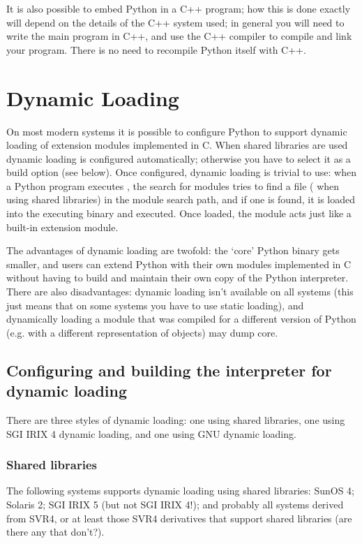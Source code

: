 It is also possible to embed Python in a C++ program; how this is done
exactly will depend on the details of the C++ system used; in general
you will need to write the main program in C++, and use the C++
compiler to compile and link your program.  There is no need to
recompile Python itself with C++.


\chapter{Dynamic Loading}

On most modern systems it is possible to configure Python to support
dynamic loading of extension modules implemented in C.  When shared
libraries are used dynamic loading is configured automatically;
otherwise you have to select it as a build option (see below).  Once
configured, dynamic loading is trivial to use: when a Python program
executes , the search for modules tries to find a
file  ( when using shared
libraries) in the module search path, and if one is found, it is
loaded into the executing binary and executed.  Once loaded, the
module acts just like a built-in extension module.

The advantages of dynamic loading are twofold: the `core' Python
binary gets smaller, and users can extend Python with their own
modules implemented in C without having to build and maintain their
own copy of the Python interpreter.  There are also disadvantages:
dynamic loading isn't available on all systems (this just means that
on some systems you have to use static loading), and dynamically
loading a module that was compiled for a different version of Python
(e.g. with a different representation of objects) may dump core.


\section{Configuring and building the interpreter for dynamic loading}

There are three styles of dynamic loading: one using shared libraries,
one using SGI IRIX 4 dynamic loading, and one using GNU dynamic
loading.

\subsection{Shared libraries}

The following systems supports dynamic loading using shared libraries:
SunOS 4; Solaris 2; SGI IRIX 5 (but not SGI IRIX 4!); and probably all
systems derived from SVR4, or at least those SVR4 derivatives that
support shared libraries (are there any that don't?).

